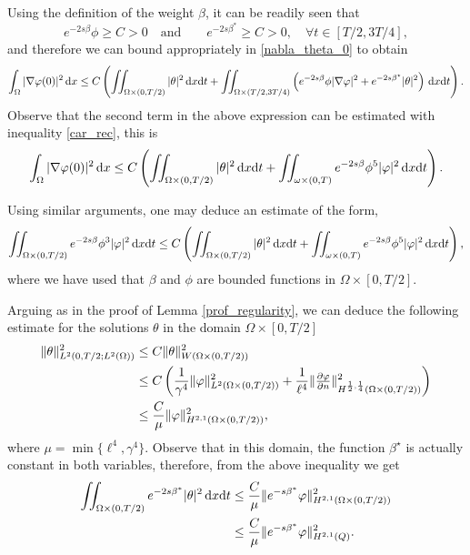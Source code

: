 \documentclass{aims}
\theoremstyle{definition}
\def\dx{\,\textnormal{d}x}
\def\dt{\textnormal{d}t}
\begin{document}
Using the definition of the weight $\beta$, it can be readily seen that
%
\begin{equation*}
e^{-2s\beta}\phi\geq C >0 \quad\text{and}\quad \quad  e^{-2s\beta^*}\geq C>0, \quad \forall t\in[T/2,3T/4],
\end{equation*}
%
and therefore we can bound appropriately in \eqref{nabla_theta_0} to obtain
%
\begin{equation*}
\int_{\Omega}|\nabla\varphi(0)|^2\dx\leq C\left(\iint_{\Omega\times(0,T/2)}|\theta|^2\dx\dt+\iint_{\Omega\times(T/2,3T/4)}\left(e^{-2s\beta}\phi|\nabla\varphi|^2+e^{-2s\beta^\star}|\theta|^2\right)\dx\dt\right).
\end{equation*}
%
Observe that the second term in the above expression can be estimated with inequality \eqref{car_rec}, this is
%
\begin{equation}\label{est_h01_theta}
\int_{\Omega}|\nabla\varphi(0)|^2\dx\leq C\left(\iint_{\Omega\times(0,T/2)}|\theta|^2\dx\dt+\iint_{\omega\times(0,T)}e^{-2s\beta}\phi^5|\varphi|^2\dx\dt\right).
\end{equation}

Using similar arguments, one may deduce an estimate of the form,
%
\begin{equation}\label{est_phi_0}
\iint_{\Omega\times(0,T/2)}e^{-2s\beta}\phi^3|\varphi|^2\dx\dt\leq C\left(\iint_{\Omega\times(0,T/2)}|\theta|^2\dx\dt+\iint_{\omega\times(0,T)}e^{-2s\beta}\phi^5|\varphi|^2\dx\dt\right),
\end{equation}
%
where we have used that $\beta$ and $\phi$ are bounded functions in $\Omega\times[0,T/2]$.

Arguing as in the proof of Lemma \ref{prof_regularity}, we can deduce the following estimate for the solutions $\theta$ in the domain $\Omega\times [0,T/2]$
%
\begin{align}\notag 
\|\theta\|^2_{L^2(0,T/2;L^2(\Omega))}&\leq C\|\theta\|^2_{W(\Omega\times(0,T/2))}\\ \notag
&\leq C\left(\frac{1}{\gamma^4}\|\varphi\|^2_{L^2(\Omega\times(0,T/2))}+\frac{1}{\ell^4}\|\tfrac{\partial \varphi}{\partial n}\|^2_{H^{\frac12,\frac14}(\Omega\times(0,T/2))}\right) \\ \label{est_theta}
&\leq \frac{C}{\mu}\|\varphi\|_{H^{2,1}(\Omega\times(0,T/2))}^2,
\end{align}
%
where $\mu=\min\{\ell^4,\gamma^4\}$. Observe that in this domain, the function $\beta^\star$ is actually constant in both variables, therefore, from the above inequality we get
%
\begin{align}\notag
\iint_{\Omega\times(0,T/2)}e^{-2s\beta^*}|\theta|^2\dx\dt &\leq \frac{C}{\mu}\|e^{-s\beta^*}\varphi\|_{H^{2,1}(\Omega\times(0,T/2))}^2 \\ \label{est_theta_tme}
&\leq \frac{C}{\mu}\|e^{-s\beta^*}\varphi\|_{H^{2,1}(Q)}^2.
\end{align}
%
\end{document}

